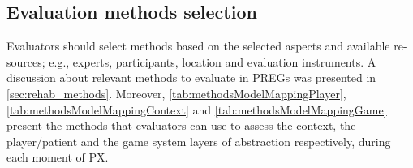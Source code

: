 \begin{table}[htb]
\caption{Aspects to evaluate the game system layer over time}
\label{tab:aspectsModelMappingGame}
\myfloatalign
{}
\end{table}


\subsection{Evaluation methods selection}
Evaluators should select methods based on the selected aspects and available re-sources; e.g., experts, participants, location and evaluation instruments. A discussion about relevant methods to evaluate in \acp{PREG} was presented in \autoref{sec:rehab_methods}. Moreover, \autoref{tab:methodsModelMappingPlayer}, \autoref{tab:methodsModelMappingContext} and \autoref{tab:methodsModelMappingGame} present the methods that evaluators can use to assess the context, the player/patient and the game system layers of abstraction respectively, during each moment of \ac{PX}.

